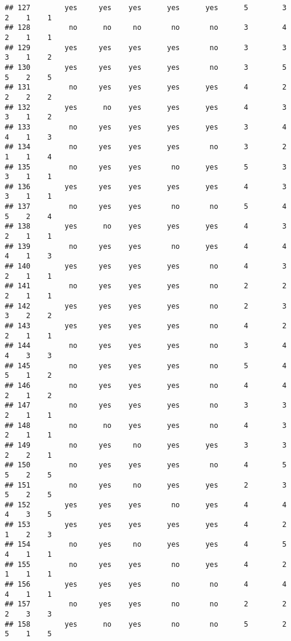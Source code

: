 \documentclass[
]{article}
\begin{document}
\begin{verbatim}
## 127        yes     yes    yes      yes      yes      5        3     2    1    1
## 128         no      no     no       no       no      3        4     2    1    1
## 129        yes     yes    yes      yes       no      3        3     3    1    2
## 130        yes     yes    yes      yes       no      3        5     5    2    5
## 131         no     yes    yes      yes      yes      4        2     2    2    2
## 132        yes      no    yes      yes      yes      4        3     3    1    2
## 133         no     yes    yes      yes      yes      3        4     4    1    3
## 134         no     yes    yes      yes       no      3        2     1    1    4
## 135         no     yes    yes       no      yes      5        3     3    1    1
## 136        yes     yes    yes      yes      yes      4        3     3    1    1
## 137         no     yes    yes       no       no      5        4     5    2    4
## 138        yes      no    yes      yes      yes      4        3     2    1    1
## 139         no     yes    yes       no      yes      4        4     4    1    3
## 140        yes     yes    yes      yes       no      4        3     2    1    1
## 141         no     yes    yes      yes       no      2        2     2    1    1
## 142        yes     yes    yes      yes       no      2        3     3    2    2
## 143        yes     yes    yes      yes       no      4        2     2    1    1
## 144         no     yes    yes      yes       no      3        4     4    3    3
## 145         no     yes    yes      yes       no      5        4     5    1    2
## 146         no     yes    yes      yes       no      4        4     2    1    2
## 147         no     yes    yes      yes       no      3        3     2    1    1
## 148         no      no    yes      yes       no      4        3     2    1    1
## 149         no     yes     no      yes      yes      3        3     2    2    1
## 150         no     yes    yes      yes       no      4        5     5    2    5
## 151         no     yes     no      yes      yes      2        3     5    2    5
## 152        yes     yes    yes       no      yes      4        4     4    3    5
## 153        yes     yes    yes      yes      yes      4        2     1    2    3
## 154         no     yes     no      yes      yes      4        5     4    1    1
## 155         no     yes    yes       no      yes      4        2     1    1    1
## 156        yes     yes    yes       no       no      4        4     4    1    1
## 157         no     yes    yes       no       no      2        2     2    3    3
## 158        yes      no    yes       no       no      5        2     5    1    5

\end{verbatim}
\end{document}
